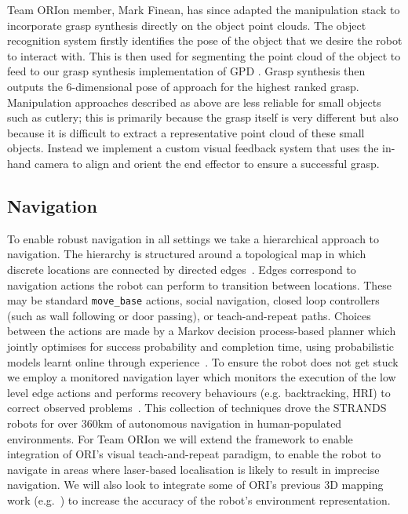 \documentclass[runningheads,a4paper]{llncs}
\newcommand{\teamori}{Team ORIon}
\begin{document}
Team ORIon member, Mark Finean, has since adapted the manipulation stack to incorporate grasp synthesis directly on the object point clouds. The object recognition system firstly identifies the pose of the object that we desire the robot to interact with. This is then used for segmenting the point cloud of the object to feed to our grasp synthesis implementation of GPD \cite{GPD1} \cite{GPD2}. Grasp synthesis then outputs the 6-dimensional pose of approach for the highest ranked grasp.
Manipulation approaches described as above are less reliable for small objects such as cutlery; this is primarily because the grasp itself is very different but also because it is difficult to extract a representative point cloud of these small objects. Instead we implement a custom visual feedback system that uses the in-hand camera to align and orient the end effector to ensure a successful grasp.  

\subsection{Navigation}

To enable robust navigation in all settings we take a hierarchical approach to navigation. The hierarchy is structured around a topological map in which discrete locations are connected by directed edges~\cite{jpulido2015NowOrLater}. Edges correspond to navigation actions the robot can perform to transition between locations. These may be standard \texttt{move\_base} actions, social navigation, closed loop controllers (such as wall following or door passing), or teach-and-repeat paths. Choices between the actions are made by a Markov decision process-based planner which jointly optimises for success probability and completion time, using probabilistic models learnt online through experience~\cite{lacerda_ijrr19}. To ensure the robot does not get stuck we employ a monitored navigation layer which monitors the execution of the low level edge actions and performs recovery behaviours (e.g. backtracking, HRI) to correct observed problems~\cite{strands@ram}. This collection of techniques drove the STRANDS robots for over 360km of autonomous navigation in human-populated environments. For \teamori{} we will extend the framework to enable integration of ORI's visual teach-and-repeat paradigm, to enable the robot to navigate in areas where laser-based localisation is likely to result in imprecise navigation. We will also look to integrate some of ORI's previous 3D mapping work (e.g.~\cite{AmayoICRA2016}) to increase the accuracy of the robot's environment representation.
\end{document}
